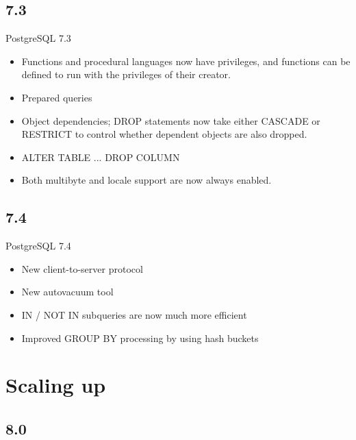\documentclass[t,10pt]{beamer}
\begin{document}
\subsection{7.3}
\begin{frame}{PostgreSQL 7.3}
  \begin{itemize}%
  \item Functions and procedural languages now have privileges, and functions can be defined to run with the privileges of their creator.
  \item Prepared queries
  \item Object dependencies; DROP statements now take either CASCADE or RESTRICT to control whether dependent objects are also dropped.
  \item ALTER TABLE ... DROP COLUMN
  \item Both multibyte and locale support are now always enabled.
  \end{itemize}
\end{frame}

\subsection{7.4}
\begin{frame}{PostgreSQL 7.4}
  \begin{itemize}%
  \item New client-to-server protocol
  \item New autovacuum tool
  \item IN / NOT IN subqueries are now much more efficient
  \item Improved GROUP BY processing by using hash buckets
  \end{itemize}
\end{frame}

\section{Scaling up}
\subsection{8.0}
\end{document}

